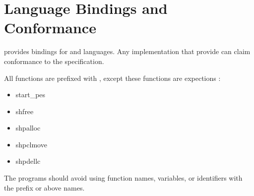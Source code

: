 \section{Language Bindings and Conformance}



\openshmem provides bindings for \Clang{} and \Fortran{} languages. Any
implementation that provide \Clang{} can claim conformance to the specification.

All \openshmem{} functions are prefixed with \shmemprefix{}, except these
functions are expections :
\begin{itemize}
\item start\_pes{}
\item shfree{}
\item shpalloc{}
\item shpclmove{}
\item shpdellc{}
\end{itemize}

The \openshmem{} programs should avoid using function names, variables, or
identifiers with the prefix \shmemprefix{} or above names. 
